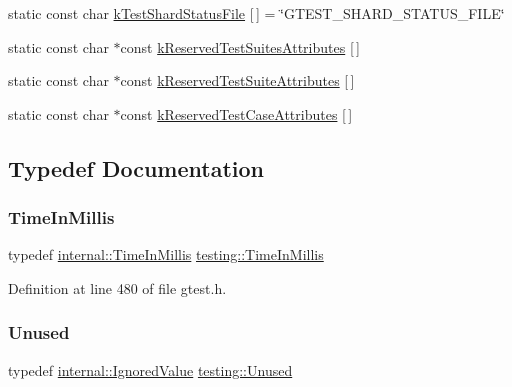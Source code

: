 \begin{DoxyCompactItemize}
\item 
static const char \hyperlink{namespacetesting_a57d3eeb1e968b4f1efc4787b2d39fbfa}{k\+Test\+Shard\+Status\+File} \mbox{[}$\,$\mbox{]} = \char`\"{}G\+T\+E\+S\+T\+\_\+\+S\+H\+A\+R\+D\+\_\+\+S\+T\+A\+T\+U\+S\+\_\+\+F\+I\+LE\char`\"{}
\item 
static const char $\ast$const \hyperlink{namespacetesting_afa194c15a2ac0e03029019b0f4029968}{k\+Reserved\+Test\+Suites\+Attributes} \mbox{[}$\,$\mbox{]}
\item 
static const char $\ast$const \hyperlink{namespacetesting_af44b2969928d37e9081145760f21e79a}{k\+Reserved\+Test\+Suite\+Attributes} \mbox{[}$\,$\mbox{]}
\item 
static const char $\ast$const \hyperlink{namespacetesting_ae9689f28cd859736f734623b26c93d88}{k\+Reserved\+Test\+Case\+Attributes} \mbox{[}$\,$\mbox{]}
\end{DoxyCompactItemize}


\subsection{Typedef Documentation}
\mbox{\label{namespacetesting_a992de1d091ce660f451d1e8b3ce30fd6}} 
\subsubsection{\texorpdfstring{Time\+In\+Millis}{TimeInMillis}}
{\footnotesize\ttfamily typedef \hyperlink{namespacetesting_1_1internal_a66a845df404b38fe85c5e14a069f255a}{internal\+::\+Time\+In\+Millis} \hyperlink{namespacetesting_a992de1d091ce660f451d1e8b3ce30fd6}{testing\+::\+Time\+In\+Millis}}



Definition at line 480 of file gtest.\+h.

\mbox{\label{namespacetesting_a603e329ec0263ebfcf16f712810bd511}} 
\subsubsection{\texorpdfstring{Unused}{Unused}}
{\footnotesize\ttfamily typedef \hyperlink{classtesting_1_1internal_1_1IgnoredValue}{internal\+::\+Ignored\+Value} \hyperlink{namespacetesting_a603e329ec0263ebfcf16f712810bd511}{testing\+::\+Unused}}



